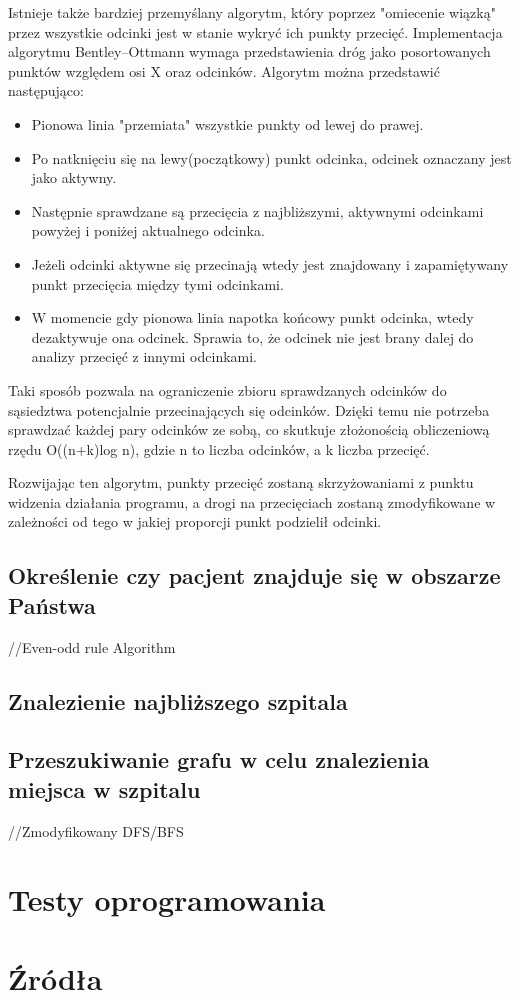 \documentclass[10pt,a4paper]{article}
\begin{document}
Istnieje także bardziej przemyślany algorytm, który poprzez "omiecenie wiązką" przez wszystkie odcinki jest w stanie wykryć ich punkty przecięć.
Implementacja algorytmu Bentley–Ottmann wymaga przedstawienia dróg jako posortowanych punktów względem osi X oraz odcinków. Algorytm można przedstawić następująco:
\begin{itemize}
    \item Pionowa linia "przemiata" wszystkie punkty od lewej do prawej.
    \item Po natknięciu się na lewy(początkowy) punkt odcinka, odcinek oznaczany jest jako aktywny.
    \item Następnie sprawdzane są przecięcia z najbliższymi, aktywnymi odcinkami powyżej i poniżej aktualnego odcinka.
    \item Jeżeli odcinki aktywne się przecinają wtedy jest znajdowany i zapamiętywany punkt przecięcia między tymi odcinkami.
    \item W momencie gdy pionowa linia napotka końcowy punkt odcinka, wtedy dezaktywuje ona odcinek. Sprawia to, że odcinek nie jest brany dalej do analizy przecięć z innymi odcinkami.
\end{itemize}
Taki sposób pozwala na ograniczenie zbioru sprawdzanych odcinków do sąsiedztwa potencjalnie przecinających się odcinków.
Dzięki temu nie potrzeba sprawdzać każdej pary odcinków ze sobą, co skutkuje złożonością obliczeniową rzędu O((n+k)log n), gdzie n to liczba odcinków, a k liczba przecięć.

Rozwijając ten algorytm, punkty przecięć zostaną skrzyżowaniami z punktu widzenia działania programu, a drogi na przecięciach zostaną zmodyfikowane w zależności od tego w jakiej proporcji punkt podzielił odcinki.


\subsection{Określenie czy pacjent znajduje się w obszarze Państwa}

//Even-odd rule Algorithm

\subsection{Znalezienie najbliższego szpitala}

\subsection{Przeszukiwanie grafu w celu znalezienia miejsca w szpitalu}

//Zmodyfikowany DFS/BFS

\section{Testy oprogramowania}


\section{Źródła}
\end{document}

